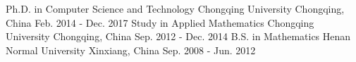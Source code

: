 

\begin{cventries}
    \cventry%
    {Ph.D. in Computer Science and Technology}
    {Chongqing University}
    {Chongqing, China}
    {Feb. 2014 - Dec. 2017} %
    {}
    \vspace{-0.3cm}
	\cventry%
	{Study in Applied Mathematics}
	{Chongqing University}
	{Chongqing, China}
	{Sep. 2012 - Dec. 2014} %
	{}
	\vspace{-0.3cm}
    \cventry%
    {B.S. in Mathematics}
    {Henan Normal University}
    {Xinxiang, China}
    {Sep. 2008 - Jun. 2012} %
    {}
    \vspace{-0.3cm}
\end{cventries}
\vspace{-0.2cm}

